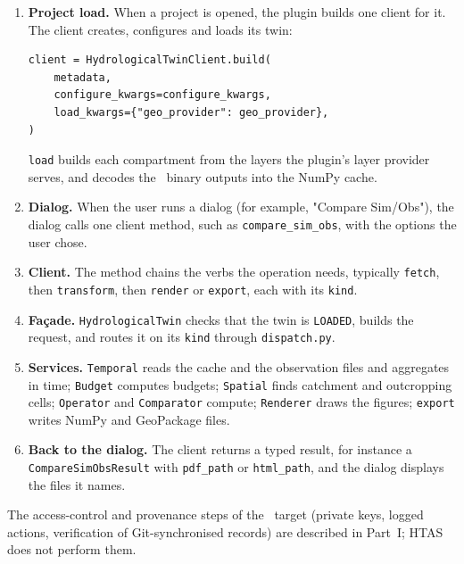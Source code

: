 \begin{enumerate}

    \item \textbf{Project load.} When a project is opened, the plugin builds one
    client for it. The client creates, configures and loads its twin:
    \begin{verbatim}
client = HydrologicalTwinClient.build(
    metadata,
    configure_kwargs=configure_kwargs,
    load_kwargs={"geo_provider": geo_provider},
)
    \end{verbatim}
    \texttt{load} builds each compartment from the layers the plugin's layer
    provider serves, and decodes the \cw\ binary outputs into the NumPy cache.

    \item \textbf{Dialog.} When the user runs a dialog (for example,
    "Compare Sim/Obs"), the dialog calls one client method, such as
    \texttt{compare\_sim\_obs}, with the options the user chose.

    \item \textbf{Client.} The method chains the verbs the operation needs,
    typically \texttt{fetch}, then \texttt{transform}, then \texttt{render} or
    \texttt{export}, each with its \texttt{kind}.

    \item \textbf{Façade.} \texttt{HydrologicalTwin} checks that the twin is
    \texttt{LOADED}, builds the request, and routes it on its \texttt{kind}
    through \texttt{dispatch.py}.

    \item \textbf{Services.} \texttt{Temporal} reads the cache and the
    observation files and aggregates in time; \texttt{Budget} computes
    budgets; \texttt{Spatial} finds catchment and outcropping cells;
    \texttt{Operator} and \texttt{Comparator} compute; \texttt{Renderer} draws
    the figures; \texttt{export} writes NumPy and GeoPackage files.

    \item \textbf{Back to the dialog.} The client returns a typed result, for
    instance a \texttt{CompareSimObsResult} with \texttt{pdf\_path} or
    \texttt{html\_path}, and the dialog displays the files it names.

\end{enumerate}

The access-control and provenance steps of the \hydrot\ target (private keys,
logged actions, verification of Git-synchronised records) are described in
Part~I; HTAS does not perform them.

